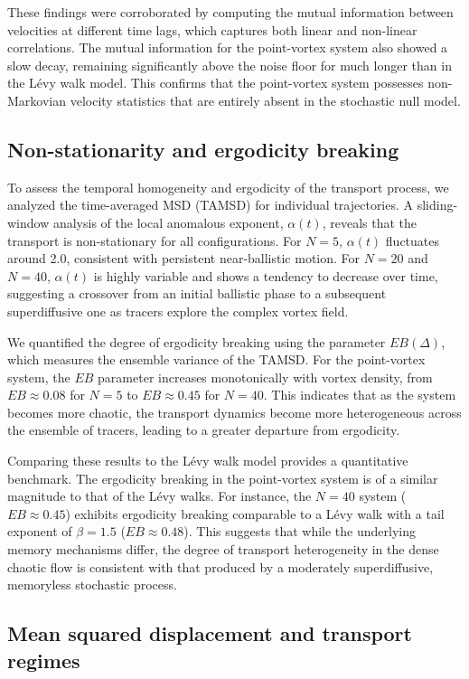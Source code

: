 \documentclass[]{article}
\begin{document}
These findings were corroborated by computing the mutual information between velocities at different time lags, which captures both linear and non-linear correlations. The mutual information for the point-vortex system also showed a slow decay, remaining significantly above the noise floor for much longer than in the L\'evy walk model. This confirms that the point-vortex system possesses non-Markovian velocity statistics that are entirely absent in the stochastic null model.

\subsection{Non-stationarity and ergodicity breaking}

To assess the temporal homogeneity and ergodicity of the transport process, we analyzed the time-averaged MSD (TAMSD) for individual trajectories. A sliding-window analysis of the local anomalous exponent, $\alpha(t)$, reveals that the transport is non-stationary for all configurations. For $N=5$, $\alpha(t)$ fluctuates around 2.0, consistent with persistent near-ballistic motion. For $N=20$ and $N=40$, $\alpha(t)$ is highly variable and shows a tendency to decrease over time, suggesting a crossover from an initial ballistic phase to a subsequent superdiffusive one as tracers explore the complex vortex field.

We quantified the degree of ergodicity breaking using the parameter $EB(\Delta)$, which measures the ensemble variance of the TAMSD. For the point-vortex system, the $EB$ parameter increases monotonically with vortex density, from $EB \approx 0.08$ for $N=5$ to $EB \approx 0.45$ for $N=40$. This indicates that as the system becomes more chaotic, the transport dynamics become more heterogeneous across the ensemble of tracers, leading to a greater departure from ergodicity.

Comparing these results to the L\'evy walk model provides a quantitative benchmark. The ergodicity breaking in the point-vortex system is of a similar magnitude to that of the L\'evy walks. For instance, the $N=40$ system ($EB \approx 0.45$) exhibits ergodicity breaking comparable to a L\'evy walk with a tail exponent of $\beta=1.5$ ($EB \approx 0.48$). This suggests that while the underlying memory mechanisms differ, the degree of transport heterogeneity in the dense chaotic flow is consistent with that produced by a moderately superdiffusive, memoryless stochastic process.

\subsection{Mean squared displacement and transport regimes}
\end{document}
